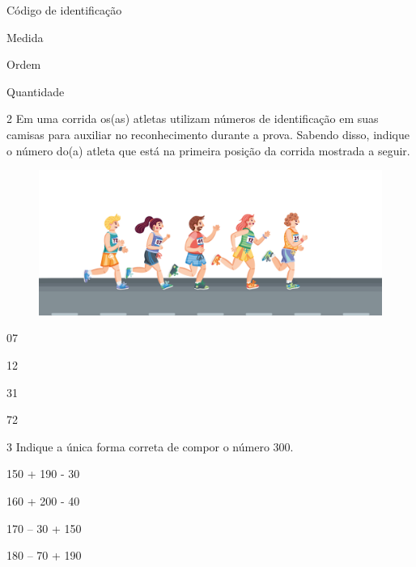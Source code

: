 \begin{escolha}[itemsep=-5pt]
\item Código de identificação

\item Medida

\item Ordem

\item Quantidade
\end{escolha}


\num{2} Em uma corrida os(as) atletas utilizam números de identificação em suas
camisas para auxiliar no reconhecimento durante a prova. Sabendo disso,
indique o número do(a) atleta que está na primeira posição da corrida
mostrada a seguir.

\begin{figure}[H]
\includegraphics[width=\textwidth]{./media/image138.png}
\end{figure}

\begin{escolha}[itemsep=-5pt]
\item 07

\item 12

\item 31

\item 72
\end{escolha}

\num{3} Indique a única forma correta de compor o número 300.

\begin{escolha}[itemsep=-5pt]
\item 150 + 190 - 30

\item 160 + 200 - 40

\item 170 -- 30 + 150

\item 180 -- 70 + 190
\end{escolha}


